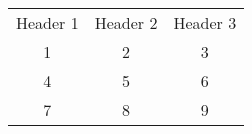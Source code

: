 \documentclass{article}
\begin{document}
\begin{tabular}{c | c | c}
\hline
Header 1 & Header 2 & Header 3 \\
1 & 2 & 3 \\
4 & 5 & 6 \\
7 & 8 & 9 \\
\hline
\end{tabular}
\end{document}

